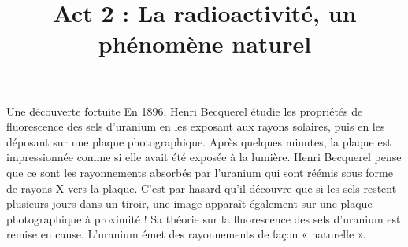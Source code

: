 \documentclass[24pt]{article}
\newcommand{\titreActivite}{\huge Act 2 : La radioactivité, un phénomène naturel} %
\begin{document}
\thispagestyle{fancy}

\date{}
\title{\titreActivite}
\maketitle %


\begin{documentpeda}{Une découverte fortuite}
    En 1896, Henri Becquerel étudie les propriétés de fluorescence des sels d’uranium en
    les exposant aux rayons solaires, puis en les déposant sur une plaque photographique.
    Après quelques minutes, la plaque est impressionnée comme si elle avait été exposée à la lumière.
    Henri Becquerel pense
    que ce sont les rayonnements absorbés par l’uranium qui sont réémis sous forme de rayons X vers la plaque.
    C’est par hasard qu’il découvre que si les sels restent plusieurs jours dans un tiroir, une image apparaît
    également sur une plaque photographique à proximité ! Sa théorie sur la fluorescence des sels d’uranium
    est remise en cause. L’uranium émet des rayonnements de façon « naturelle ».
\end{documentpeda}
\end{document}
